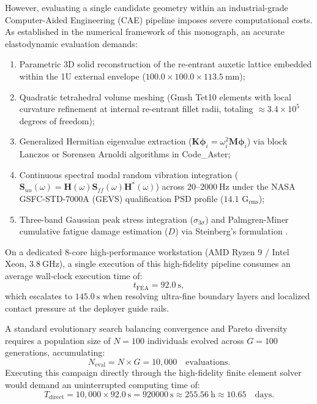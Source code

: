 However, evaluating a single candidate geometry within an industrial-grade Computer-Aided Engineering (CAE) pipeline imposes severe computational costs. As established in the numerical framework of this monograph, an accurate elastodynamic evaluation demands:
\begin{enumerate}
\item Parametric 3D solid reconstruction of the re-entrant auxetic lattice embedded within the 1U external envelope ($100.0 \times 100.0 \times \SI{113.5}{\milli\meter}$);
\item Quadratic tetrahedral volume meshing (Gmsh Tet10 elements with local curvature refinement at internal re-entrant fillet radii, totaling $\approx 3.4 \times 10^5$ degrees of freedom);
\item Generalized Hermitian eigenvalue extraction ($\mathbf{K} \boldsymbol{\phi}_i = \omega_i^2 \mathbf{M} \boldsymbol{\phi}_i$) via block Lanczos or Sorensen Arnoldi algorithms in Code\_Aster;
\item Continuous spectral modal random vibration integration ($\mathbf{S}_{uu}(\omega) = \mathbf{H}(\omega) \mathbf{S}_{ff}(\omega) \mathbf{H}^*(\omega)$) across $20\text{--}\SI{2000}{\hertz}$ under the NASA GSFC-STD-7000A (GEVS) qualification PSD profile ($14.1\text{ G}_{\text{rms}}$);
\item Three-band Gaussian peak stress integration ($\sigma_{3\sigma}$) and Palmgren-Miner cumulative fatigue damage estimation ($D$) via Steinberg's formulation \cite{steinberg2000}.
\end{enumerate}

On a dedicated 8-core high-performance workstation (AMD Ryzen 9 / Intel Xeon, $\SI{3.8}{\giga\hertz}$), a single execution of this high-fidelity pipeline consumes an average wall-clock execution time of:
\begin{equation}
t_{\text{FEA}} = \SI{92.0}{\second},
\label{eq:fea_execution_time}
\end{equation}
which escalates to $\SI{145.0}{\second}$ when resolving ultra-fine boundary layers and localized contact pressure at the deployer guide rails.

A standard evolutionary search balancing convergence and Pareto diversity requires a population size of $N = 100$ individuals evolved across $G = 100$ generations, accumulating:
\begin{equation}
N_{\text{eval}} = N \times G = 10{,}000 \quad \text{evaluations}.
\label{eq:eval_budget}
\end{equation}
Executing this campaign directly through the high-fidelity finite element solver would demand an uninterrupted computing time of:
\begin{equation}
T_{\text{direct}} = 10{,}000 \times \SI{92.0}{\second} = \SI{920000}{\second} \approx \SI{255.56}{\hour} \approx 10.65\quad \text{days}.
\label{eq:direct_fea_time}
\end{equation}

